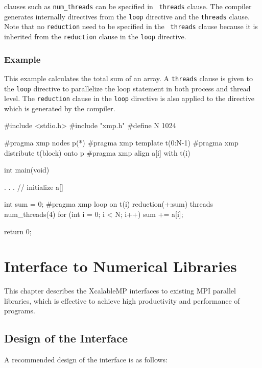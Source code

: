    {\OMP} clauses such as {\tt num\_threads} can be specified in {\tt
   threads} clause.
   The {\XMP} compiler generates internally {\OMP} directives from the
   {\tt loop} directive and the {\tt threads} clause.
   Note that no {\tt reduction} need to be specified in the {\tt
   threads} clause because it is inherited from the {\tt reduction}
   clause in the {\tt loop} directive.

\subsection*{Example}

   This example calculates the total sum of an array.
   A {\tt threads} clause is given to the {\tt loop} directive to
   parallelize the loop statement in both process and
   thread level. 
   The {\tt reduction} clause in the {\tt loop} directive is also
   applied to the {\OMP} directive which is generated by the {\XMP}
   compiler.

\begin{XCexample}
#include <stdio.h>
#include "xmp.h"
#define N 1024

#pragma xmp nodes p(*)
#pragma xmp template t(0:N-1)
#pragma xmp distribute t(block) onto p
#pragma xmp align a[i] with t(i)

int main(void) {
  . . . // initialize a[]

  int sum = 0;
#pragma xmp loop on t(i) reduction(+:sum) threads num_threads(4)
  for (int i = 0; i < N; i++) {
    sum += a[i];
  }

  return 0;
}
\end{XCexample}

\cleardoublepage

\chapter{Interface to Numerical Libraries}
\label{chap:Interface to Numerical Libraries}

   This chapter describes the XcalableMP interfaces to existing MPI
   parallel libraries, which is effective to achieve high productivity
   and performance of {\XMP} programs.
   
\section{Design of the Interface}

A recommended design of the interface is as follows:

